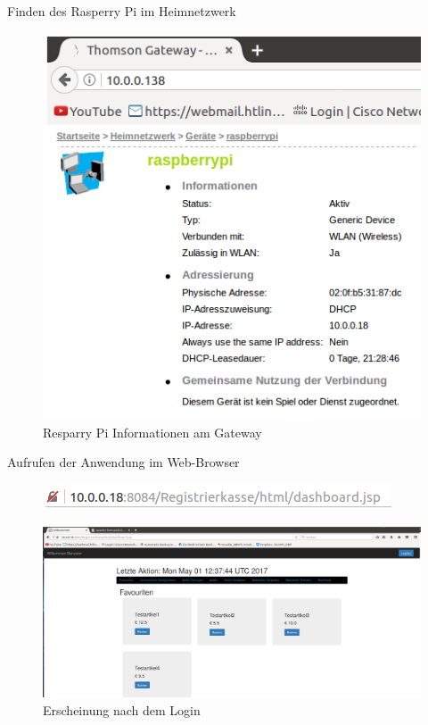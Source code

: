 \documentclass[12pt]{beamer}
\begin{document}
\begin{frame}
	Finden des Rasperry Pi im Heimnetzwerk
	\begin{figure}
		\includegraphics[scale=0.46]{Bilder/gatewayInt.png}
		\caption{Resparry Pi Informationen am Gateway}
	\end{figure}		
\end{frame}

\begin{frame}
	Aufrufen der Anwendung im Web-Browser
	
	\begin{figure}
		\includegraphics[scale=0.7]{Bilder/url.png}
	\end{figure}
	\begin{figure}
		\includegraphics[scale=0.13]{Bilder/favouriten.png}
		\caption{Erscheinung nach dem Login}
	\end{figure}
\end{frame}
\end{document}
